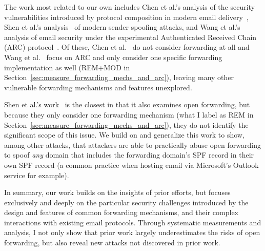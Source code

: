 The work most related to our own includes Chen et al.'s analysis of
the security vulnerabilities introduced by protocol composition in
modern email delivery~\cite{chen2020composition}, Shen et al.'s
analysis~\cite{shen2020weak} of modern sender spoofing attacks, and Wang et al.'s~\cite{wang2022revisiting} analysis of email security under the experimental Authenticated Received Chain (ARC) protocol~\cite{rfc8617}.
Of these, Chen et al.~\cite{chen2020composition} do not consider forwarding at all and Wang et al.~\cite{wang2022revisiting} focus on ARC and only consider one specific forwarding implementation as well (REM+MOD in Section~\ref{sec:measure_forwarding_mechs_and_arc}), leaving many other vulnerable forwarding mechanisms and features unexplored.

Shen et al.'s work~\cite{shen2020weak} is the closest in that it also
examines open forwarding, but because they only consider one
forwarding mechanism (what I label as REM in
Section~\ref{sec:measure_forwarding_mechs_and_arc}), they do not
identify the significant scope of this issue.  We build on and
generalize this work to show, among other attacks, that attackers are
able to practically abuse open forwarding to spoof \emph{any} domain
that includes the forwarding domain's SPF record in their own SPF record (a
common practice when hosting email via Microsoft's Outlook service for example).



In summary, our work builds on the insights of prior efforts, but focuses exclusively and deeply on the particular security challenges introduced by the design and features of common forwarding mechanisms, and their complex interactions with existing email protocols. Through systematic measurements and analysis, I not only show that prior work largely underestimates the risks of open forwarding,
but also reveal new attacks not discovered in prior work.



